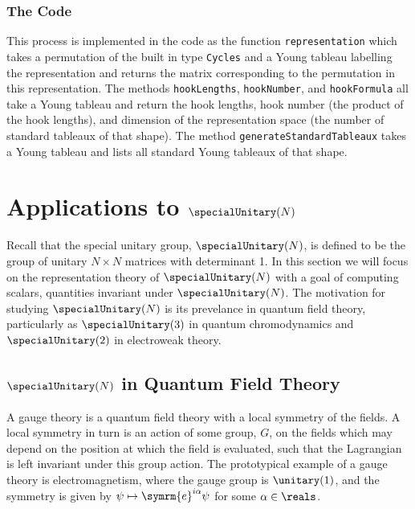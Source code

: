 \documentclass[fleqn]{NotesClass}
\newcommand{\e}{\symrm{e}}
\begin{document}
    \subsection{The Code}
    This process is implemented in the code as the function \lstinline|representation| which takes a permutation of the built in type \lstinline|Cycles| and a Young tableau labelling the representation and returns the matrix corresponding to the permutation in this representation.
    The methods \lstinline|hookLengths|, \lstinline|hookNumber|, and \lstinline|hookFormula| all take a Young tableau and return the hook lengths, hook number (the product of the hook lengths), and dimension of the representation space (the number of standard tableaux of that shape).
    The method \lstinline|generateStandardTableaux| takes a Young tableau and lists all standard Young tableaux of that shape.
    
    \chapter{Applications to \texorpdfstring{\(\specialUnitary(N)\)}{SU(N)}}
    Recall that the special unitary group, \(\specialUnitary(N)\), is defined to be the group of unitary \(N \times N\) matrices with determinant 1.
    In this section we will focus on the representation theory of \(\specialUnitary(N)\) with a goal of computing scalars, quantities invariant under \(\specialUnitary(N)\).
    The motivation for studying \(\specialUnitary(N)\) is its prevelance in quantum field theory, particularly as \(\specialUnitary(3)\) in quantum chromodynamics and \(\specialUnitary(2)\) in electroweak theory.
    
    \section{\texorpdfstring{\(\specialUnitary(N)\)}{SU(N)} in Quantum Field Theory}
    A gauge theory is a quantum field theory with a local symmetry of the fields.
    A local symmetry in turn is an action of some group, \(G\), on the fields which may depend on the position at which the field is evaluated, such that the Lagrangian is left invariant under this group action.
    The prototypical example of a gauge theory is electromagnetism, where the gauge group is \(\unitary(1)\), and the symmetry is given by \(\psi \mapsto \e^{i\alpha}\psi\) for some \(\alpha \in \reals\).
    
\end{document}
